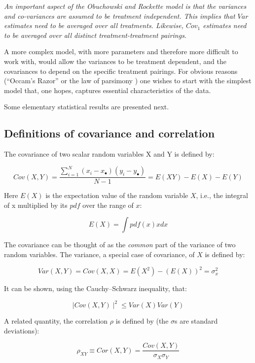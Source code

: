 \documentclass[
]{book}
\begin{document}
\emph{An important aspect of the Obuchowski and Rockette model is that the variances and co-variances are assumed to be treatment independent. This implies that \(Var\) estimates need to be averaged over all treatments. Likewise, \(Cov_1\) estimates need to be averaged over all distinct treatment-treatment pairings.}

A more complex model, with more parameters and therefore more difficult to work with, would allow the variances to be treatment dependent, and the covariances to depend on the specific treatment pairings. For obvious reasons (``Occam's Razor'' or the law of parsimony ) one wishes to start with the simplest model that, one hopes, captures essential characteristics of the data.

Some elementary statistical results are presented next.

\hypertarget{definitions-of-covariance-and-correlation}{%
\subsection{Definitions of covariance and correlation}\label{definitions-of-covariance-and-correlation}}

The covariance of two scalar random variables X and Y is defined by:

\begin{equation}
Cov(X,Y) =\frac{\sum_{i=1}^{N}(x_{i}-x_{\bullet})(y_{i}-y_{\bullet})}{N-1}=E(XY)-E(X)-E(Y)
\label{eq:DefinitionCovariance}
\end{equation}

Here \(E(X)\) is the expectation value of the random variable \(X\), i.e., the integral of x multiplied by its \(pdf\) over the range of \(x\):

\[E(X)=\int pdf(x) x dx\]

The covariance can be thought of as the \emph{common} part of the variance of two random variables. The variance, a special case of covariance, of \(X\) is defined by:

\[Var(X,Y) = Cov(X,X)=E(X^2)-(E(X))^2=\sigma_x^2\]

It can be shown, using the Cauchy--Schwarz inequality, that:

\[\mid Cov(X,Y) \mid^2 \le Var(X)Var(Y)\]

A related quantity, the correlation \(\rho\) is defined by (the \(\sigma\)s are standard deviations):

\[\rho_{XY} \equiv Cor(X,Y)=\frac{Cov(X,Y)}{\sigma_X \sigma_Y}\]
\end{document}
